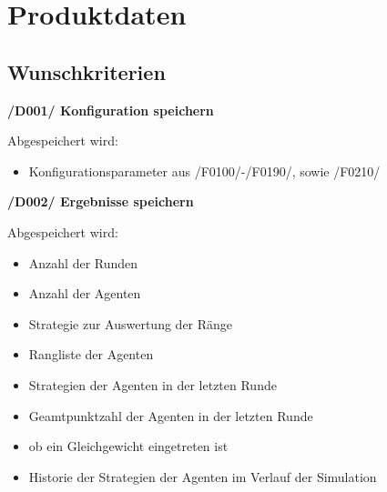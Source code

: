 \section{Produktdaten}

\subsection{Wunschkriterien}

\textbf{/D001/ Konfiguration speichern}

Abgespeichert wird:
\begin{itemize}
\item Konfigurationsparameter aus /F0100/-/F0190/, sowie /F0210/
\end{itemize}

\textbf{/D002/ Ergebnisse speichern}	

Abgespeichert wird:
\begin{itemize}
\item Anzahl der Runden
\item Anzahl der Agenten
\item Strategie zur Auswertung der Ränge
\item Rangliste der Agenten
\item Strategien der Agenten in der letzten Runde
\item Geamtpunktzahl der Agenten in der letzten Runde
\item ob ein Gleichgewicht eingetreten ist
\item Historie der Strategien der Agenten im Verlauf der Simulation
\end{itemize}
